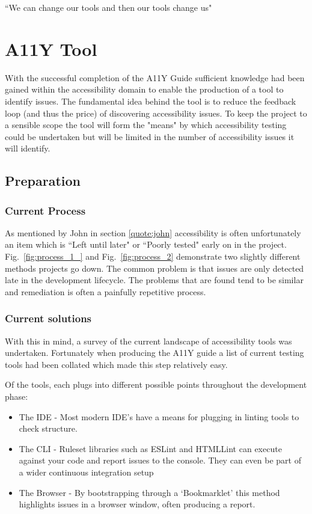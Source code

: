 \begin{savequote}[75mm]
``We can change our tools and then our tools change us"
\end{savequote}

\chapter{A11Y Tool}
With the successful completion of the A11Y Guide sufficient knowledge had
been gained within the accessibility domain to enable the production of a
tool to identify issues. The fundamental idea behind the tool is to reduce
the feedback loop (and thus the price) of discovering accessibility issues. To
keep the project to a sensible scope the tool will form the "means" by which
accessibility testing could be undertaken but will be limited in the number
of accessibility issues it will identify.

\section{Preparation}
\subsection{Current Process}
As mentioned by John in section \ref{quote:john} accessibility is often
unfortunately an item which is ``Left until later" or ``Poorly tested" early
on in the project. Fig.~\ref{fig:process_1_} and Fig.~\ref{fig:process_2}
demonstrate two slightly different methods projects go down. The common
problem is that issues are only detected late in the development lifecycle.
The problems that are found tend to be similar and remediation is often a
painfully repetitive process.

\subsection{Current solutions}
\label{sec:currentSolutions}
With this in mind, a survey of the current landscape of accessibility tools was
undertaken. Fortunately when producing the A11Y guide a list of current
testing tools had been collated which made this step relatively easy.

Of the tools, each plugs into different possible points throughout the
development phase:
 \begin{itemize}
 \item The IDE - Most modern IDE's have a means for plugging in linting tools
  to check structure.
 \item The CLI - Ruleset libraries such as ESLint and HTMLLint can execute
 against your code and report issues to the console. They can even be part of
  a wider continuous integration setup
  \item The Browser - By bootstrapping through a `Bookmarklet' this method
  highlights issues in a browser window, often producing a report.
 \end{itemize}

